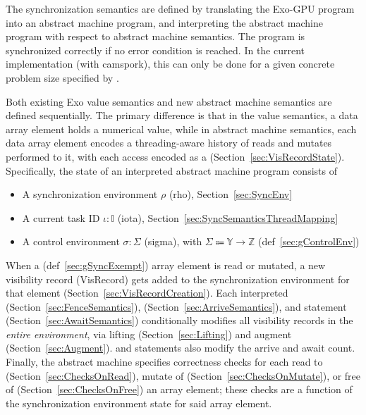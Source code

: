 

The synchronization semantics are defined by translating the Exo-GPU program into an abstract machine program, and interpreting the abstract machine program with respect to abstract machine semantics.
The program is synchronized correctly if no error condition is reached.
In the current implementation (with camspork), this can only be done for a given concrete problem size specified by .

Both existing Exo value semantics and new abstract machine semantics are defined sequentially.
The primary difference is that in the value semantics, a data array element holds a numerical value, while in abstract machine semantics, each data array element encodes a threading-aware history of reads and mutates performed to it, with each access encoded as a  (Section~\ref{sec:VisRecordState}).
Specifically, the state of an interpreted abstract machine program consists of
\begin{itemize}
  \item A synchronization environment $\rho$ (rho), Section~\ref{sec:SyncEnv}
  \item A current task ID $\iota: \mathbb{I}$ (iota), Section~\ref{sec:SyncSemanticsThreadMapping}
  \item A control environment $\sigma: \Sigma$ (sigma), with $\Sigma \Coloneqq \mathbb{Y} \to \mathbb{Z}$ (def~\ref{sec:gControlEnv})
\end{itemize}

When a  (def~\ref{sec:gSyncExempt}) array element is read or mutated, a new visibility record (\textsf{VisRecord}) gets added to the synchronization environment for that element (Section~\ref{sec:VisRecordCreation}).
Each interpreted  (Section~\ref{sec:FenceSemantics}),  (Section~\ref{sec:ArriveSemantics}), and  statement (Section~\ref{sec:AwaitSemantics}) conditionally modifies all visibility records in the \emph{entire environment}, via lifting (Section~\ref{sec:Lifting}) and augment (Section~\ref{sec:Augment}).
 and  statements also modify the arrive and await count.
Finally, the abstract machine specifies correctness checks for each read to (Section~\ref{sec:ChecksOnRead}), mutate of (Section~\ref{sec:ChecksOnMutate}), or free of (Section~\ref{sec:ChecksOnFree}) an array element; these checks are a function of the synchronization environment state for said array element.

